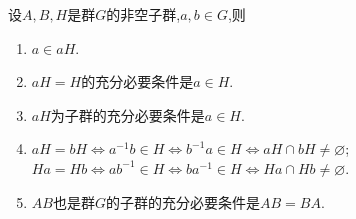 \documentclass[../../main.tex]{subfiles}%
\begin{document}
\begin{theorem}\label{theorem:子群陪集相关性质}
设$A,B,H$是群$G$的非空子群,$a,b\in G$,则
\begin{enumerate}[(1)]
\item $a\in aH$.

\item\label{theorem:子群陪集相关性质-2} $aH=H$的充分必要条件是$a\in H$.

\item $aH$为子群的充分必要条件是$a\in H$.

\item\label{theorem:子群陪集相关性质-4} $aH=bH\iff a^{-1}b\in H\iff b^{-1}a\in H\iff aH\cap bH\neq \varnothing$;
\\
$Ha=Hb\iff ab^{-1}\in H\iff ba^{-1}\in H\iff Ha\cap Hb\neq \varnothing$.

\item\label{theorem:子群陪集相关性质-5} $AB$也是群$G$的子群的充分必要条件是$AB=BA$.
\end{enumerate}
\end{theorem}
\end{document}
